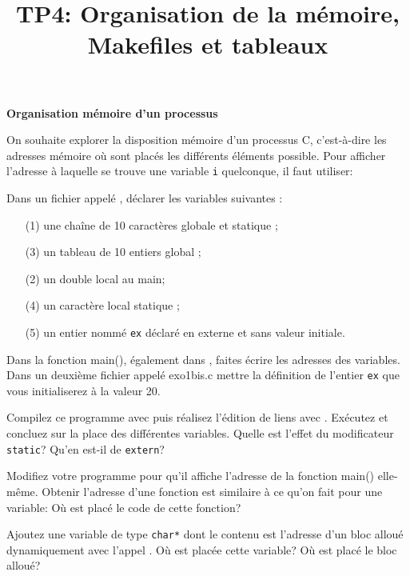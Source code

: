\documentclass[10pt]{article}\usepackage[nu]{esial}
\begin{document}
\title{TP4: Organisation de la mémoire, Makefiles et tableaux}
\maketitle

\begin{Exercice}\textbf{Organisation mémoire d'un processus}

On souhaite explorer la disposition mémoire d'un processus C, c'est-à-dire les
adresses mémoire où sont placés les différents éléments possible. Pour afficher
l'adresse à laquelle se trouve une variable \texttt{i} quelconque, il faut
utiliser: 

\Question Dans un fichier appelé , déclarer les variables
suivantes :

\noindent\begin{minipage}{.55\linewidth} 
  \begin{enumerate}
  \item[(1)] une chaîne de 10 caractères globale et statique ;
  \item[(3)] un tableau de 10 entiers global ;
  \end{enumerate}   
\end{minipage}\begin{minipage}{.45\linewidth}
  \begin{enumerate}
  \item[(2)] un double local au main;
  \item[(4)] un caractère local statique ;
  \end{enumerate}
\end{minipage}
\begin{enumerate}
\item[(5)] un entier nommé \texttt{ex} déclaré en externe et sans valeur
  initiale.
\end{enumerate}

Dans la fonction main(), également dans , faites écrire les
adresses des variables. Dans un deuxième fichier appelé exo1bis.c mettre la
définition de l'entier \texttt{ex} que vous initialiserez à la valeur 20.

\Question Compilez ce programme avec  
puis réalisez l'édition de liens avec .
Exécutez  et concluez sur la place des différentes variables. Quelle
est l'effet du modificateur \texttt{static}? Qu'en est-il de \texttt{extern}?

\Question Modifiez votre programme pour qu'il affiche l'adresse de la fonction
main() elle-même. Obtenir l'adresse d'une fonction est similaire à ce qu'on
fait pour une variable:  Où est
placé le code de cette fonction?

\Question Ajoutez une variable de type \texttt{char*} dont le contenu est
l'adresse d'un bloc alloué dynamiquement avec l'appel . Où
est placée cette variable? Où est placé le bloc alloué?
\end{Exercice}
\end{document}
